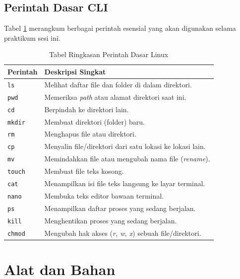 \subsection{Perintah Dasar CLI}
Tabel \ref{tab:m03-dasar-teori} merangkum berbagai perintah esensial yang akan digunakan selama praktikum sesi ini.

\begin{table}[H]
    \caption{Tabel Ringkasan Perintah Dasar Linux}
    \label{tab:m03-dasar-teori}
    \centering
    \begin{tabular}{|l|p{10cm}|}
        \hline
        \textbf{Perintah} & \textbf{Deskripsi Singkat} \\ \hline
        \texttt{ls} & Melihat daftar file dan folder di dalam direktori. \\ \hline
        \texttt{pwd} & Memeriksa \textit{path} atau alamat direktori saat ini. \\ \hline
        \texttt{cd} & Berpindah ke direktori lain. \\ \hline
        \texttt{mkdir} & Membuat direktori (folder) baru. \\ \hline
        \texttt{rm} & Menghapus file atau direktori. \\ \hline
        \texttt{cp} & Menyalin file/direktori dari satu lokasi ke lokasi lain. \\ \hline
        \texttt{mv} & Memindahkan file atau mengubah nama file (\textit{rename}). \\ \hline
        \texttt{touch} & Membuat file teks kosong. \\ \hline
        \texttt{cat} & Menampilkan isi file teks langsung ke layar terminal. \\ \hline
        \texttt{nano} & Membuka teks editor bawaan terminal. \\ \hline
        \texttt{ps} & Menampilkan daftar proses yang sedang berjalan. \\ \hline
        \texttt{kill} & Menghentikan proses yang sedang berjalan. \\ \hline
        \texttt{chmod} & Mengubah hak akses (\textit{r, w, x}) sebuah file/direktori. \\ \hline
    \end{tabular}
\end{table}

\newpage
\section{Alat dan Bahan}
\label{sec:m03-alat-bahan}


